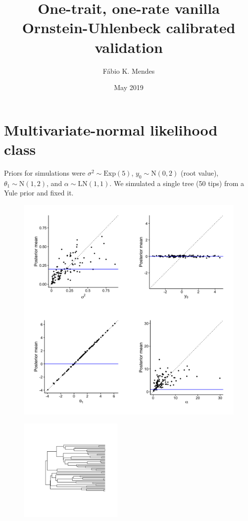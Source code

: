 \documentclass{article}
\title{One-trait, one-rate vanilla Ornstein-Uhlenbeck calibrated validation}
\author{F\'{a}bio K. Mendes}
\date{May 2019}
\begin{document}
\maketitle

\newpage

\section{Multivariate-normal likelihood class}

Priors for simulations were $\sigma^2 \sim \text{Exp}(5)$, $y_0 \sim \text{N}(0, 2)$ (root value), $\theta_1 \sim \text{N}(1, 2)$, and $\alpha \sim
\text{LN}(1, 1)$.
We simulated a single tree (50 tips) from a Yule prior and fixed it.

\begin{figure}[h]
  \centering
  \includegraphics[width=12cm]{../OUMVNVanilla_ultra_graphs.png}
\end{figure}

\begin{figure}[h]
  \centering
  \includegraphics[width=5cm]{../OUMVNVanilla_ultra_tree.png}
\end{figure}
\end{document}

